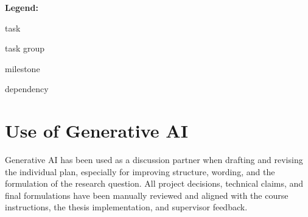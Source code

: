 \documentclass[11pt, a4paper]{article}
\begin{document}
\begin{center}
\footnotesize
\textbf{Legend:}\hspace{0.6em}
\hspace{0.25em}task
\hspace{1.2em}
\hspace{0.25em}task group
\hspace{1.2em}
\hspace{0.25em}milestone
\hspace{1.2em}
\hspace{0.25em}dependency
\end{center}

\section{Use of Generative AI}

Generative AI has been used as a discussion partner when drafting and revising the individual plan, especially for improving structure, wording, and the formulation of the research question. All project decisions, technical claims, and final formulations have been manually reviewed and aligned with the course instructions, the thesis implementation, and supervisor feedback.


\newpage
\end{document}

